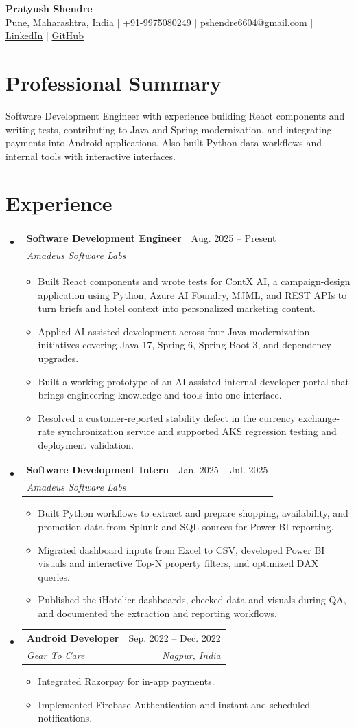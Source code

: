 \documentclass[a4paper,11pt]{article}
\makeatletter
\newcommand{\entry}[4]{\item\begin{tabularx}{\textwidth}{@{}Xr@{}}\textbf{#1}& #2\\\textit{\small #3}&\textit{\small #4}\end{tabularx}\vspace{-5pt}}
\newcommand{\bulletpoint}[1]{\item\small{#1}}
\makeatother
\begin{document}
\begin{center}
  {\Large\bfseries Pratyush Shendre}\\[2pt]
  \small Pune, Maharashtra, India $|$ +91-9975080249 $|$
  \href{mailto:pshendre6604@gmail.com}{pshendre6604@gmail.com} $|$
  \href{https://linkedin.com/in/pratyush-shendre-2256a7223/}{LinkedIn} $|$
  \href{https://github.com/PratyushS04}{GitHub}
\end{center}

\section{Professional Summary}
\small Software Development Engineer with experience building React components and writing tests, contributing to Java and Spring modernization, and integrating payments into Android applications. Also built Python data workf{}lows and internal tools with interactive interfaces.

\section{Experience}
\begin{itemize}[leftmargin=0in,label={}]
  \entry{Software Development Engineer}{Aug. 2025 -- Present}{Amadeus Software Labs}{}
  \begin{itemize}
    \bulletpoint{Built React components and wrote tests for ContX AI, a campaign-design application using Python, Azure AI Foundry, MJML, and REST APIs to turn briefs and hotel context into personalized marketing content.}
    \bulletpoint{Applied AI-assisted development across four Java modernization initiatives covering Java 17, Spring 6, Spring Boot 3, and dependency upgrades.}
    \bulletpoint{Built a working prototype of an AI-assisted internal developer portal that brings engineering knowledge and tools into one interface.}
    \bulletpoint{Resolved a customer-reported stability defect in the currency exchange-rate synchronization service and supported AKS regression testing and deployment validation.}
  \end{itemize}
  \entry{Software Development Intern}{Jan. 2025 -- Jul. 2025}{Amadeus Software Labs}{}
  \begin{itemize}
    \bulletpoint{Built Python workf{}lows to extract and prepare shopping, availability, and promotion data from Splunk and SQL sources for Power BI reporting.}
    \bulletpoint{Migrated dashboard inputs from Excel to CSV, developed Power BI visuals and interactive Top-N property f{}ilters, and optimized DAX queries.}
    \bulletpoint{Published the iHotelier dashboards, checked data and visuals during QA, and documented the extraction and reporting workf{}lows.}
  \end{itemize}
  \entry{Android Developer}{Sep. 2022 -- Dec. 2022}{Gear To Care}{Nagpur, India}
  \begin{itemize}
    \bulletpoint{Integrated Razorpay for in-app payments.}
    \bulletpoint{Implemented Firebase Authentication and instant and scheduled notif{}ications.}
  \end{itemize}
\end{itemize}
\end{document}
